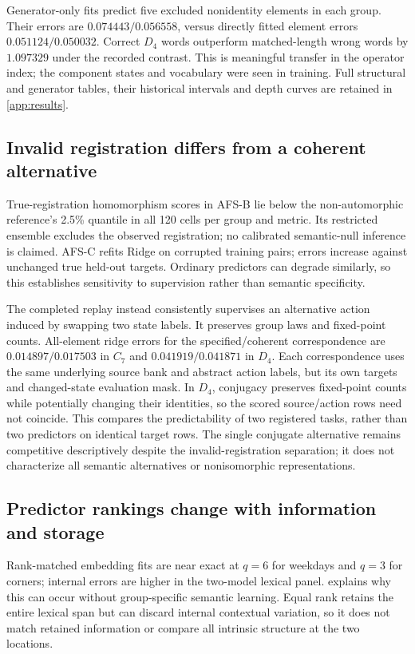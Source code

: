 \documentclass{article}
\begin{document}
Generator-only fits predict five excluded nonidentity elements in each group. Their errors are $0.074443/0.056558$, versus directly fitted element errors $0.051124/0.050032$. Correct $D_4$ words outperform matched-length wrong words by $1.097329$ under the recorded contrast. This is meaningful transfer in the operator index; the component states and vocabulary were seen in training. Full structural and generator tables, their historical intervals and depth curves are retained in \cref{app:results}.

\subsection{Invalid registration differs from a coherent alternative}
True-registration homomorphism scores in AFS-B lie below the non-automorphic reference's 2.5\% quantile in all 120 cells per group and metric. Its restricted ensemble excludes the observed registration; no calibrated semantic-null inference is claimed. AFS-C refits Ridge on corrupted training pairs; errors increase against unchanged true held-out targets. Ordinary predictors can degrade similarly, so this establishes sensitivity to supervision rather than semantic specificity.

The completed replay instead consistently supervises an alternative action induced by swapping two state labels. It preserves group laws and fixed-point counts. All-element ridge errors for the specified/coherent correspondence are $0.014897/0.017503$ in $C_7$ and $0.041919/0.041871$ in $D_4$. Each correspondence uses the same underlying source bank and abstract action labels, but its own targets and changed-state evaluation mask. In $D_4$, conjugacy preserves fixed-point counts while potentially changing their identities, so the scored source/action rows need not coincide. This compares the predictability of two registered tasks, rather than two predictors on identical target rows. The single conjugate alternative remains competitive descriptively despite the invalid-registration separation; it does not characterize all semantic alternatives or nonisomorphic representations.

\subsection{Predictor rankings change with information and storage}
\label{sec:characterization}
Rank-matched embedding fits are near exact at $q=6$ for weekdays and $q=3$ for corners; internal errors are higher in the two-model lexical panel.  explains why this can occur without group-specific semantic learning. Equal rank retains the entire lexical span but can discard internal contextual variation, so it does not match retained information or compare all intrinsic structure at the two locations.
\end{document}
